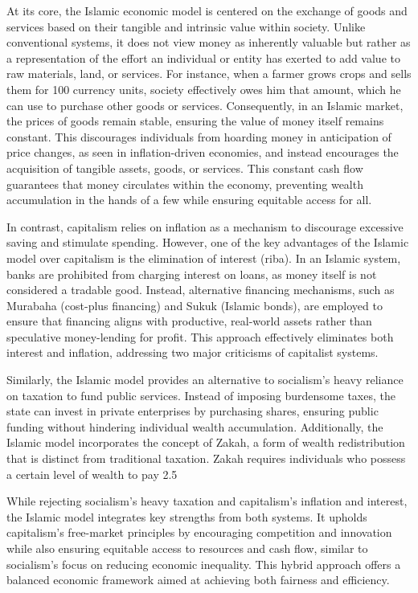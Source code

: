 \par
At its core, the Islamic economic model is centered on the exchange of goods and services based on their tangible and intrinsic value within society. Unlike conventional systems, it does not view money as inherently valuable but rather as a representation of the effort an individual or entity has exerted to add value to raw materials, land, or services. For instance, when a farmer grows crops and sells them for 100 currency units, society effectively owes him that amount, which he can use to purchase other goods or services. Consequently, in an Islamic market, the prices of goods remain stable, ensuring the value of money itself remains constant. This discourages individuals from hoarding money in anticipation of price changes, as seen in inflation-driven economies, and instead encourages the acquisition of tangible assets, goods, or services. This constant cash flow guarantees that money circulates within the economy, preventing wealth accumulation in the hands of a few while ensuring equitable access for all.

\par
In contrast, capitalism relies on inflation as a mechanism to discourage excessive saving and stimulate spending. However, one of the key advantages of the Islamic model over capitalism is the elimination of interest (riba). In an Islamic system, banks are prohibited from charging interest on loans, as money itself is not considered a tradable good. Instead, alternative financing mechanisms, such as Murabaha (cost-plus financing) and Sukuk (Islamic bonds), are employed to ensure that financing aligns with productive, real-world assets rather than speculative money-lending for profit. This approach effectively eliminates both interest and inflation, addressing two major criticisms of capitalist systems.

\par
Similarly, the Islamic model provides an alternative to socialism’s heavy reliance on taxation to fund public services. Instead of imposing burdensome taxes, the state can invest in private enterprises by purchasing shares, ensuring public funding without hindering individual wealth accumulation. Additionally, the Islamic model incorporates the concept of Zakah, a form of wealth redistribution that is distinct from traditional taxation. Zakah requires individuals who possess a certain level of wealth to pay 2.5%

\par	
While rejecting socialism’s heavy taxation and capitalism’s inflation and interest, the Islamic model integrates key strengths from both systems. It upholds capitalism’s free-market principles by encouraging competition and innovation while also ensuring equitable access to resources and cash flow, similar to socialism’s focus on reducing economic inequality. This hybrid approach offers a balanced economic framework aimed at achieving both fairness and efficiency.